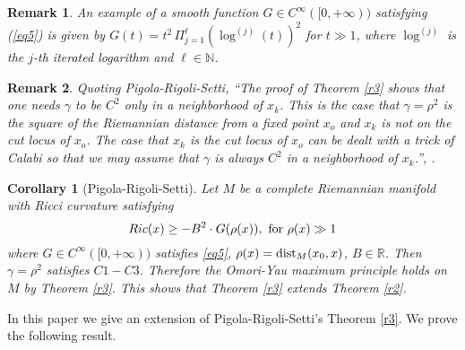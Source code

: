 \documentclass[a4paper]{amsart}
\newtheorem{corollary}{Corollary}
\newtheorem{remark}{Remark}
\begin{document}
\begin{remark}An example of a smooth function $ G\in C^{\infty}([0,+\infty)) $ satisfying (\ref{eq5}) is given by $G(t)=t^{2}\,\Pi_{j=1}^{\ell}(\log^{(j)}(t))^{2}$ for $t\gg 1$, where $\log^{(j)}$ is the $j$-th iterated logarithm and $\ell\in \mathbb{N}$.
\end{remark} \begin{remark}Quoting Pigola-Rigoli-Setti, \textquotedblleft The proof of Theorem \ref{r3} shows that one needs $\gamma$ to be $C^{2}$ only in a neighborhood of $x_{k}$. This is the case that $\gamma=\rho^{2}$ is the square of the Riemannian distance from a fixed point $x_{o}$ and $x_{k}$ is not on the cut locus of $x_{o}$. The case that $x_k$ is the cut locus of $x_o$ can be dealt with a trick of Calabi \cite{calabi} so that we may assume that $\gamma$ is always $C^{2}$ in a neighborhood of $x_k$.\textquotedblright,    \cite[Remark 1.11]{prs-memoirs}.
\end{remark}
\begin{corollary}[Pigola-Rigoli-Setti] Let $M$ be a complete Riemannian manifold with Ricci curvature satisfying $$ Ric (x)\geq - B^{2}\cdot G(\rho (x)), \, \, {\rm for}\,\, \rho (x)\gg 1$$ where $G\in C^{\infty}([0,+\infty)) $  satisfies  \eqref{eq5}, $\rho (x)={\rm dist}_{M}(x_{0}, x)$, $B\in \mathbb{R}$. Then $\gamma=\rho^{2}$ satisfies $C1-C3$. Therefore the Omori-Yau maximum principle  holds on $M$ by Theorem \ref{r3}. This shows that Theorem \ref{r3} extends Theorem \ref{r2}.
\end{corollary}

In this paper we give an extension of Pigola-Rigoli-Setti's Theorem \ref{r3}. We prove the following result.
\end{document}

